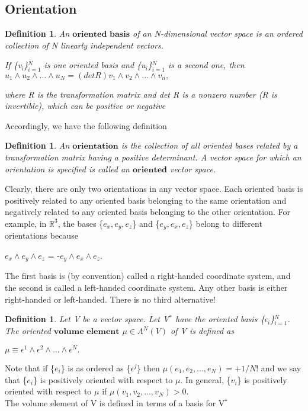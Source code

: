 \documentclass[12pt,a4paper]{article}
\newtheorem{defn}[thm]{Definition}
\begin{document}
\subsection{Orientation}
\begin{defn}
An $\textbf{oriented basis}$ of an N-dimensional vector space is
an ordered collection of N linearly independent vectors.
\begin{center}
If \{v$_i$\}$^N_{i=1}$ is one oriented basis and \{u$_i$\}$^N_{i=1}$ is a second one, then\\
$u_1 \wedge u_2 \wedge ... \wedge u_N = (det R)v_1 \wedge v_2 \wedge ... \wedge v_n,$
\end{center}
where R is the transformation matrix and det R is a nonzero number (R is
invertible), which can be positive or negative
\end{defn}
 \indent Accordingly, we have the following definition
\begin{defn}
An $\textbf{orientation}$ is the collection of all oriented bases related by a transformation matrix having a positive determinant. A vector
space for which an orientation is specified is called an $\textbf{oriented}$ vector space.
\end{defn}
\indent Clearly, there are only two orientations in any vector space. Each oriented
basis is positively related to any oriented basis belonging to the same orientation and negatively related to any oriented basis belonging to the other
orientation. For example, in $\mathbb{R}^3$,  the bases \{$e_x, e_y, e_z$\} and \{$e_y, e_x, e_z$\} belong
to different orientations because
\begin{center}
$e_x \wedge e_y \wedge e_z$ = -$e_y \wedge e_x \wedge e_z$.
\end{center}

The first basis is (by convention) called a right-handed coordinate system,
and the second is called a left-handed coordinate system. Any other basis
is either right-handed or left-handed. There is no third alternative!

\begin{defn}
Let V be a vector space. Let V$^{*}$ have the oriented basis \{$\epsilon_i$\}$^N_{i=1}$. The oriented $\textbf{volume element}$ $\mu \in \Lambda^{N}(V)$ of V is defined as
\begin{center}
$\mu \equiv \epsilon^1 \wedge \epsilon^2 \wedge ... \wedge \epsilon^N.$
\end{center}
\end{defn}
\indent Note that if \{$e_i$\} is as ordered as \{$\epsilon^j$\} then $\mu( e_1, e_2, ... , e_N) = +1/N!$ and we say that \{$e_i$\} is positively oriented with respect to $\mu$. In general, \{$v_i$\}  is
positively oriented with respect to $\mu$ if $\mu(v_1, v_2, ... , v_N) > 0$. \\ The volume element of V is defined in terms of a basis for V$^*$
\end{document}
